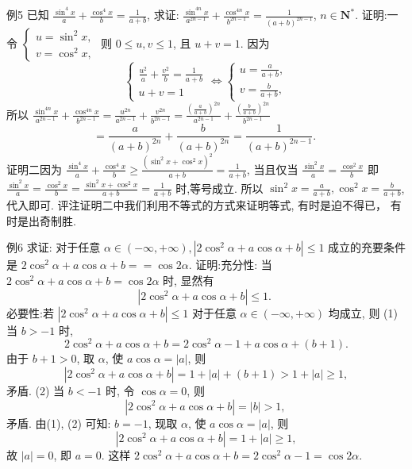 例5 已知 $\frac{\sin ^4 x}{a}+\frac{\cos ^4 x}{b}=\frac{1}{a+b}$, 求证: $\frac{\sin ^{4 n} x}{a^{2 n-1}}+\frac{\cos ^{4 n} x}{b^{2 n-1}}=\frac{1}{(a+b)^{2 n-1}}$, $n \in \mathbf{N}^*$.
证明:一令 $\left\{\begin{array}{l}u=\sin ^2 x, \\ v=\cos ^2 x,\end{array}\right.$ 则 $0 \leqslant u, v \leqslant 1$, 且 $u+v=1$.
因为
$$
\left\{\begin{array} { l } 
{ \frac { u ^ { 2 } } { a } + \frac { v ^ { 2 } } { b } = \frac { 1 } { a + b } } \\
{ u + v = 1 }
\end{array} \Leftrightarrow \left\{\begin{array}{l}
u=\frac{a}{a+b}, \\
v=\frac{b}{a+b},
\end{array}\right.\right.
$$
所以 $\frac{\sin ^{4 n} x}{a^{2 n-1}}+\frac{\cos ^{4 n} x}{b^{2 n-1}}=\frac{u^{2 n}}{a^{2 n-1}}+\frac{v^{2 n}}{b^{2 n-1}}=\frac{\left(\frac{a}{a+b}\right)^{2 n}}{a^{2 n-1}}+\frac{\left(\frac{b}{a+b}\right)^{2 n}}{b^{2 n-1}}$
$$
=\frac{a}{(a+b)^{2 n}}+\frac{b}{(a+b)^{2 n}}=\frac{1}{(a+b)^{2 n-1}} \text {. }
$$
证明二因为 $\frac{\sin ^4 x}{a}+\frac{\cos ^4 x}{b} \geqslant \frac{\left(\sin ^2 x+\cos ^2 x\right)^2}{a+b}=\frac{1}{a+b}$,
当且仅当 $\frac{\sin ^2 x}{a}=\frac{\cos ^2 x}{b}$ 即 $\frac{\sin ^2 x}{a}=\frac{\cos ^2 x}{b}=\frac{\sin ^2 x+\cos ^2 x}{a+b}=\frac{1}{a+b}$ 时,等号成立.
所以 $\sin ^2 x=\frac{a}{a+b}, \cos ^2 x=\frac{b}{a+b}$, 代入即可.
评注证明二中我们利用不等式的方式来证明等式, 有时是迫不得已， 有时是出奇制胜.



例6 求证: 对于任意 $\alpha \in(-\infty,+\infty),\left|2 \cos ^2 \alpha+a \cos \alpha+b\right| \leqslant 1$ 成立的充要条件是 $2 \cos ^2 \alpha+a \cos \alpha+b==\cos 2 \alpha$.
证明:充分性: 当 $2 \cos ^2 \alpha+a \cos \alpha+b=\cos 2 \alpha$ 时, 显然有
$$
\left|2 \cos ^2 \alpha+a \cos \alpha+b\right| \leqslant 1 \text {. }
$$
必要性:若 $\left|2 \cos ^2 \alpha+a \cos \alpha+b\right| \leqslant 1$ 对于任意 $\alpha \in(-\infty,+\infty)$ 均成立, 则 
(1) 当 $b>-1$ 时,
$$
2 \cos ^2 \alpha+a \cos \alpha+b=2 \cos ^2 \alpha-1+a \cos \alpha+(b+1) .
$$
由于 $b+1>0$, 取 $\alpha$, 使 $a \cos \alpha=|a|$, 则
$$
\left|2 \cos ^2 \alpha+a \cos \alpha+b\right|=1+|a|+(b+1)>1+|a| \geqslant 1,
$$
矛盾.
(2) 当 $b<-1$ 时, 令 $\cos \alpha=0$, 则
$$
\left|2 \cos ^2 \alpha+a \cos \alpha+b\right|=|b|>1 \text {, }
$$
矛盾.
由(1), (2) 可知: $b=-1$, 现取 $\alpha$, 使 $a \cos \alpha=|a|$, 则
$$
\left|2 \cos ^2 \alpha+a \cos \alpha+b\right|=1+|a| \geqslant 1,
$$
故 $|a|=0$, 即 $a=0$.
这样 $2 \cos ^2 \alpha+a \cos \alpha+b=2 \cos ^2 \alpha-1=\cos 2 \alpha$.



